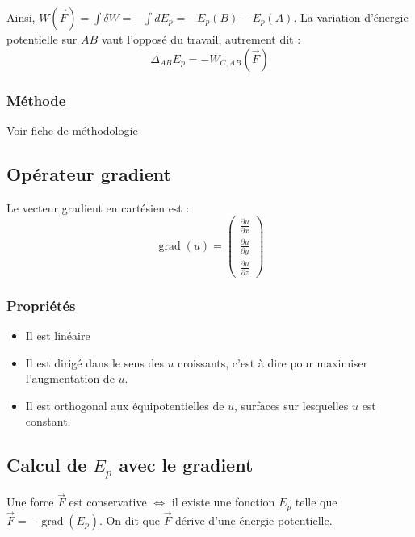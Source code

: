 \documentclass[french]{yLectureNote}
\renewcommand{\vec}{\overrightarrow}
\DeclareMathOperator\grad{grad}
\begin{document}
Ainsi, $W(\vec{F}) = \int \delta W = -\int dE_p = -E_p(B)-E_p(A)$. La variation d'énergie potentielle sur $AB$ vaut l'opposé du travail, autrement dit :\[\Delta_{AB} E_p = -W_{C,AB}(\vec{F})\]
\subsubsection{Méthode}
Voir fiche de méthodologie
\subsection{Opérateur gradient}
Le vecteur gradient en cartésien  est :
\[\grad(u) =  \begin{pmatrix}
\frac{\partial u}{\partial x} \\
 \frac{\partial u}{\partial y}\\
 \frac{\partial u}{\partial z}
\end{pmatrix}\]

\subsubsection{Propriétés}
\begin{itemize}
 \item Il est linéaire
 \item Il est dirigé dans le sens des $u$ croissants, c'est à dire pour maximiser l'augmentation de $u$.
 \item Il est orthogonal aux équipotentielles de $u$, surfaces sur lesquelles $u$ est constant.
\end{itemize}
\subsection{Calcul de $E_p$ avec le gradient}
\begin{definition}
Une force $\vec{F}$ est conservative $\iff$ il existe une fonction $E_p$ telle que $\vec{F} = -\grad(E_p)$. On dit que $\vec{F}$ dérive d'une énergie potentielle.
\end{definition}
\end{document}
